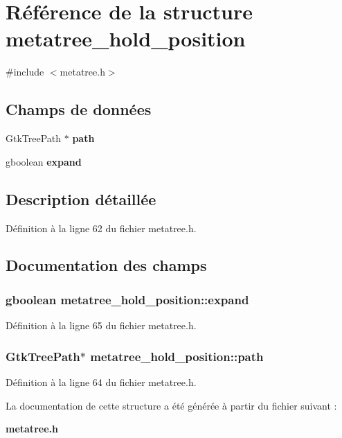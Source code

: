 \section{Référence de la structure metatree\_\-hold\_\-position}
\label{structmetatree__hold__position}


{\ttfamily \#include $<$metatree.h$>$}

\subsection*{Champs de données}
\begin{DoxyCompactItemize}
\item 
GtkTreePath $\ast$ {\bf path}
\item 
gboolean {\bf expand}
\end{DoxyCompactItemize}


\subsection{Description détaillée}


Définition à la ligne 62 du fichier metatree.h.



\subsection{Documentation des champs}
\subsubsection[{expand}]{\setlength{\rightskip}{0pt plus 5cm}gboolean {\bf metatree\_\-hold\_\-position::expand}}\label{structmetatree__hold__position_a1a26e0c68691326ba8b92328eb0597ce}


Définition à la ligne 65 du fichier metatree.h.

\subsubsection[{path}]{\setlength{\rightskip}{0pt plus 5cm}GtkTreePath$\ast$ {\bf metatree\_\-hold\_\-position::path}}\label{structmetatree__hold__position_a117af8b442325dd362705fa0eb784ffa}


Définition à la ligne 64 du fichier metatree.h.



La documentation de cette structure a été générée à partir du fichier suivant :\begin{DoxyCompactItemize}
\item 
{\bf metatree.h}\end{DoxyCompactItemize}
